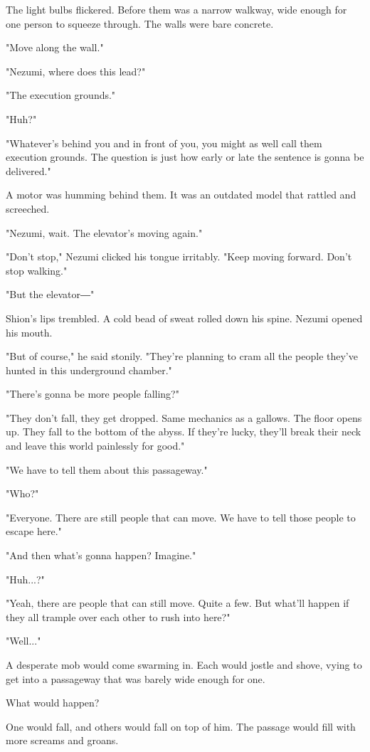 The light bulbs flickered. Before them was a narrow walkway, wide enough
for one person to squeeze through. The walls were bare concrete.

"Move along the wall."

"Nezumi, where does this lead?"

"The execution grounds."

"Huh?"

"Whatever's behind you and in front of you, you might as well call them
execution grounds. The question is just how early or late the sentence
is gonna be delivered."

A motor was humming behind them. It was an outdated model that rattled
and screeched.

"Nezumi, wait. The elevator's moving again."

"Don't stop," Nezumi clicked his tongue irritably. "Keep moving forward.
Don't stop walking."

"But the elevator―"

Shion's lips trembled. A cold bead of sweat rolled down his spine.
Nezumi opened his mouth.

"But of course," he said stonily. "They're planning to cram all the
people they've hunted in this underground chamber."

"There's gonna be more people falling?"

"They don't fall, they get dropped. Same mechanics as a gallows. The
floor opens up. They fall to the bottom of the abyss. If they're lucky,
they'll break their neck and leave this world painlessly for good."

"We have to tell them about this passageway."

"Who?"

"Everyone. There are still people that can move. We have to tell those
people to escape here."

"And then what's gonna happen? Imagine."

"Huh...?"

"Yeah, there are people that can still move. Quite a few. But what'll
happen if they all trample over each other to rush into here?"

"Well..."

A desperate mob would come swarming in. Each would jostle and shove,
vying to get into a passageway that was barely wide enough for one.

What would happen?

One would fall, and others would fall on top of him. The passage would
fill with more screams and groans.

